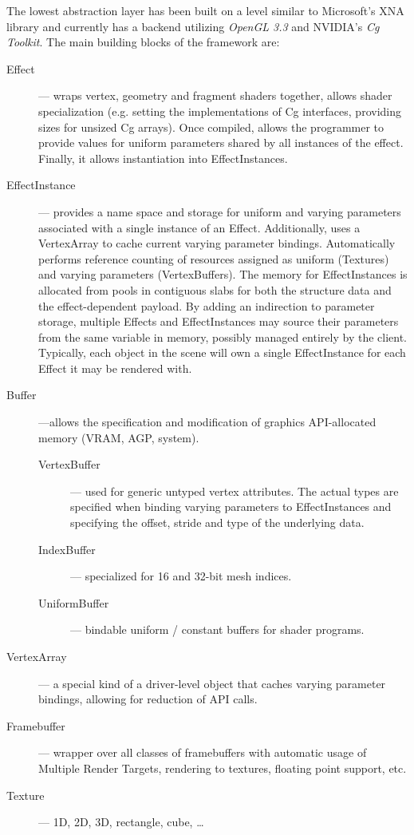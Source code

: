 The lowest abstraction layer has been built on a level similar to Microsoft's XNA library and currently has a backend utilizing \emph{OpenGL 3.3} and NVIDIA's \emph{Cg Toolkit}. The main building blocks of the framework are:

\begin{description}

\item[Effect] --- wraps vertex, geometry and fragment shaders together, allows shader specialization (e.g. setting the implementations of Cg interfaces, providing sizes for unsized Cg arrays). Once compiled, allows the programmer to provide values for uniform parameters shared by all instances of the effect. Finally, it allows instantiation into EffectInstances.

\item[EffectInstance] --- provides a name space and storage for uniform and varying parameters associated with a single instance of an Effect. Additionally, uses a VertexArray to cache current varying parameter bindings. Automatically performs reference counting of resources assigned as uniform (Textures) and varying parameters (VertexBuffers). The memory for EffectInstances is allocated from pools in contiguous slabs for both the structure data and the effect-dependent payload. By adding an indirection to parameter storage, multiple Effects and EffectInstances may source their parameters from the same variable in memory, possibly managed entirely by the client. Typically, each object in the scene will own a single EffectInstance for each Effect it may be rendered with.

\item[Buffer] ---allows the specification and modification of graphics API-allocated memory (VRAM, AGP, system).

\begin{description}
\item[VertexBuffer] --- used for generic untyped vertex attributes. The actual types are specified when binding varying parameters to EffectInstances and specifying the offset, stride and type of the underlying data.
\item[IndexBuffer] --- specialized for 16 and 32-bit mesh indices.
\item[UniformBuffer] --- bindable uniform / constant buffers for shader programs.
\end{description}

\item[VertexArray] --- a special kind of a driver-level object that caches varying parameter bindings, allowing for reduction of API calls.

\item[Framebuffer] --- wrapper over all classes of framebuffers with automatic usage of Multiple Render Targets, rendering to textures, floating point support, etc.

\item[Texture] --- 1D, 2D, 3D, rectangle, cube, \ldots
\end{description}

